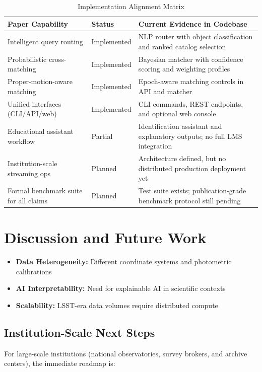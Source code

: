 \documentclass[10pt]{article}
\begin{document}
\begin{table}[H]
\centering
\caption{Implementation Alignment Matrix}
\label{tab:alignment_matrix}
\begin{tabular}{p{4.2cm} p{2.6cm} p{6.2cm}}
\toprule
\textbf{Paper Capability} & \textbf{Status} & \textbf{Current Evidence in Codebase} \\
\midrule
Intelligent query routing & Implemented & NLP router with object classification and ranked catalog selection \\
Probabilistic cross-matching & Implemented & Bayesian matcher with confidence scoring and weighting profiles \\
Proper-motion-aware matching & Implemented & Epoch-aware matching controls in API and matcher \\
Unified interfaces (CLI/API/web) & Implemented & CLI commands, REST endpoints, and optional web console \\
Educational assistant workflow & Partial & Identification assistant and explanatory outputs; no full LMS integration \\
Institution-scale streaming ops & Planned & Architecture defined, but no distributed production deployment yet \\
Formal benchmark suite for all claims & Planned & Test suite exists; publication-grade benchmark protocol still pending \\
\bottomrule
\end{tabular}
\end{table}

\section{Discussion and Future Work}
\label{sec:discussion}

\begin{itemize}
    \item \textbf{Data Heterogeneity:} Different coordinate systems and photometric calibrations
    \item \textbf{AI Interpretability:} Need for explainable AI in scientific contexts
    \item \textbf{Scalability:} LSST-era data volumes require distributed compute
\end{itemize}

\subsection{Institution-Scale Next Steps}
For large-scale institutions (national observatories, survey brokers, and archive centers), the immediate roadmap is:
\end{document}
